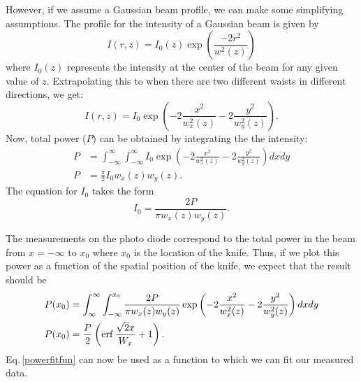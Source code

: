However, if we assume a Gaussian beam profile, we can make some simplifying assumptions.
The profile for the intensity of a Gaussian beam is given by
\begin{equation} \label{electricFieldExplicitForm}
I(r,z)=I_0(z)
\exp \left(\frac{-2 r^2}{w^2(z)}\right)
\end{equation}
where $I_0(z)$ represents the intensity at the center of the beam for any given value of $z$.
Extrapolating this to when there are two different waists in different directions, we get: 
\begin{equation}
I(r,z)= I_0\exp \left(-2\frac{x^2}{w_x^2(z)}-2\frac{y^2}{w_y^2(z)}\right) . 
\end{equation}
Now, total power ($P$) can be obtained by integrating the the intensity: 
\begin{align}
P&=\int_{-\infty}^{\infty}\int_{-\infty}^{\infty} I_0 \exp \left(-2\frac{x^2}{w_x^2(z)}-2\frac{y^2}{w_y^2(z)}\right) dx dy\\
P&=\frac{\pi}{2} I_0 w_x(z) w_y(z).
\end{align}
The equation for $I_0$ takes the form
\begin{equation}
I_0=\frac{2 P}{\pi w_x(z) w_y(z)}.
\end{equation}

The measurements on the photo diode correspond to the total power in the beam from $x=-\infty$ to $x_0$ where $x_0$ is the location of the knife. Thus, if we plot this power as a function of the spatial position of the knife, we expect that the result should be 
\begin{align}
P(x_0)&=\int_{\infty}^{\infty}\int_{-\infty}^{x_0} \frac{2 P}{\pi w_x(z) w_y(z)}\exp \left(-2\frac{x^2}{w_x^2(z)}-2\frac{y^2}{w_y^2(z)}\right) dx dy\\
P(x_0)&=\frac{P}{2} \left(\operatorname{erf} \frac{\sqrt{2} x}{W_x}+1 \right).\label{powerfitfun}
\end{align}
Eq.\,\ref{powerfitfun} can now be used as a function to which we can fit our measured data. 


